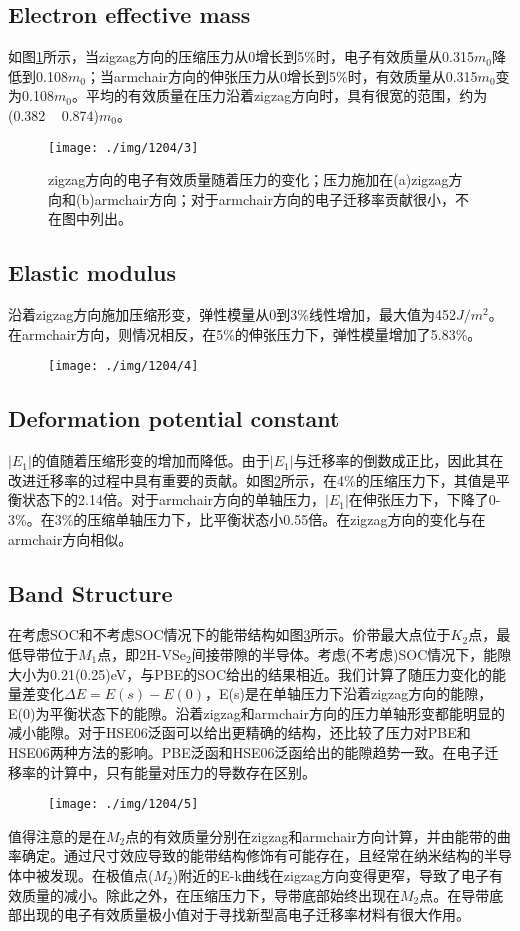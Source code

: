 \documentclass[reprint, aps, prb, showkeys]{revtex4-2}
\begin{document}
\subsection{Electron effective mass}
如图\ref{fig:effectiveMass}所示，当zigzag方向的压缩压力从0增长到5\%时，电子有效质量从0.315$m_0$降低到0.108$m_0$；当armchair方向的伸张压力从0增长到5\%时，有效质量从0.315$m_0$变为0.108$m_0$。平均的有效质量在压力沿着zigzag方向时，具有很宽的范围，约为(0.382 ~ 0.874)$m_0$。
\begin{figure}[t]
    \texttt{[image: ./img/1204/3]}
    \caption{\label{fig:effectiveMass} 
    zigzag方向的电子有效质量随着压力的变化；压力施加在(a)zigzag方向和(b)armchair方向；对于armchair方向的电子迁移率贡献很小，不在图中列出。
    }
\end{figure}

\subsection{Elastic modulus}
沿着zigzag方向施加压缩形变，弹性模量从0到3\%线性增加，最大值为452$J/m^2$。在armchair方向，则情况相反，在5\%的伸张压力下，弹性模量增加了5.83\%。
\begin{figure}[b]
    \texttt{[image: ./img/1204/4]}
    \caption{\label{fig:elastic}
    }
\end{figure}
\subsection{Deformation potential constant}
$|E_1|$的值随着压缩形变的增加而降低。由于$|E_1|$与迁移率的倒数成正比，因此其在改进迁移率的过程中具有重要的贡献。如图\ref{fig:elastic}所示，在4\%的压缩压力下，其值是平衡状态下的2.14倍。对于armchair方向的单轴压力，$|E_1|$在伸张压力下，下降了0-3\%。在3\%的压缩单轴压力下，比平衡状态小0.55倍。在zigzag方向的变化与在armchair方向相似。
\subsection{Band Structure}
在考虑SOC和不考虑SOC情况下的能带结构如图\ref{fig:band}所示。价带最大点位于$K_2$点，最低导带位于$M_1$点，即2H-VSe$_2$间接带隙的半导体。考虑(不考虑)SOC情况下，能隙大小为0.21(0.25)eV，与PBE的SOC给出的结果相近。我们计算了随压力变化的能量差变化${\Delta}E = E(s) - E(0)$，E(s)是在单轴压力下沿着zigzag方向的能隙，E(0)为平衡状态下的能隙。沿着zigzag和armchair方向的压力单轴形变都能明显的减小能隙。对于HSE06泛函可以给出更精确的结构，还比较了压力对PBE和HSE06两种方法的影响。PBE泛函和HSE06泛函给出的能隙趋势一致。在电子迁移率的计算中，只有能量对压力的导数存在区别。
\begin{figure}[t]
    \texttt{[image: ./img/1204/5]}
    \caption{\label{fig:band}
    }
\end{figure}
值得注意的是在$M_2$点的有效质量分别在zigzag和armchair方向计算，并由能带的曲率确定。通过尺寸效应导致的能带结构修饰有可能存在，且经常在纳米结构的半导体中被发现。在极值点($M_2$)附近的E-k曲线在zigzag方向变得更窄，导致了电子有效质量的减小。除此之外，在压缩压力下，导带底部始终出现在$M_2$点。在导带底部出现的电子有效质量极小值对于寻找新型高电子迁移率材料有很大作用。
\end{document}
